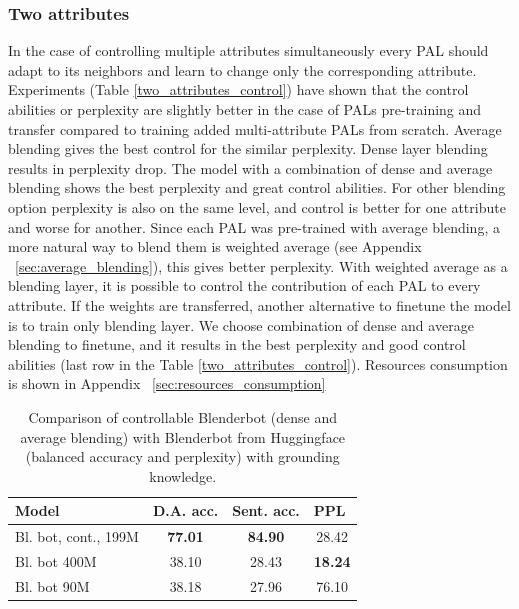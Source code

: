 \documentclass[11pt]{article}
\begin{document}
\subsubsection{Two attributes}

In the case of controlling multiple attributes simultaneously every PAL should adapt to its neighbors and  learn to change only the corresponding attribute. Experiments (Table \ref{two_attributes_control}) have shown that the control abilities or perplexity are slightly better in the case of PALs pre-training and transfer compared to training added multi-attribute PALs from scratch. Average blending gives the best control for the similar perplexity. Dense layer blending results in perplexity drop. The model with a combination of dense and average blending shows the best perplexity and great control abilities.
For other blending option perplexity is also on the same level, and control is better for one attribute and worse for another. Since each PAL was pre-trained with average blending, a more natural way to blend them is weighted average (see Appendix ~\ref{sec:average_blending}), this gives better perplexity. With weighted average as a blending layer, it is possible to control the contribution of each PAL to every attribute. 
If the weights are transferred, another alternative to finetune the model is to train only blending layer. We choose combination of dense and average blending to finetune, and it results in the best perplexity and good control abilities (last row in the Table \ref{two_attributes_control}). Resources consumption is shown in Appendix ~\ref{sec:resources_consumption}

\begin{table}[ht]
\fontsize{9}{11}
\selectfont 
\centering
\begin{tabular}{lccc}
\hline
Model                         & D.A. acc. & Sent. acc. & \multicolumn{1}{l}{PPL} \\ \hline
Bl. bot, cont., 199M      & \textbf{77.01}                 & \textbf{84.90}               & 28.42                               \\
Bl. bot 400M & 38.10                 & 28.43               & \textbf{18.24}                                \\
Bl. bot 90M  & 38.18                 & 27.96               & 76.10                              \\ \hline
\end{tabular}
\caption{Comparison of controllable Blenderbot (dense and average blending) with Blenderbot from Huggingface (balanced accuracy and perplexity) with grounding knowledge.}
\label{blenderbot_cont_and_baselines}
\end{table}
\end{document}
